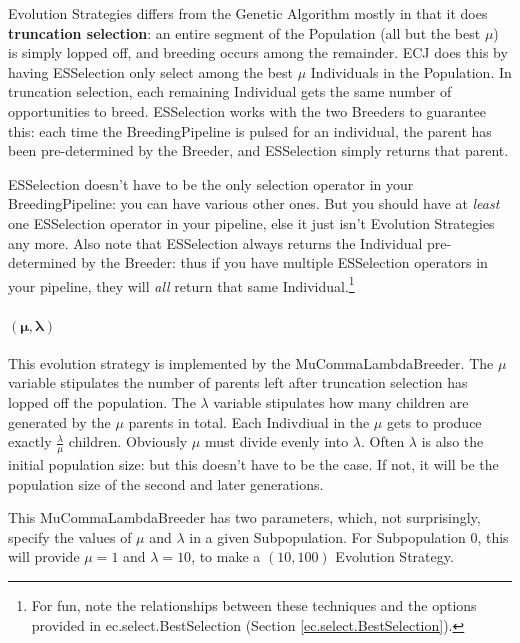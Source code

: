 \documentclass[twoside,10pt]{book}
\newcommand\class[1]{\index{#1}\textsf{#1}}
\begin{document}
Evolution Strategies differs from the Genetic Algorithm mostly in that it does {\bf truncation selection}: an entire segment of the Population (all but the best \(\mu\)) is simply lopped off, and breeding occurs among the remainder.  ECJ does this by having ESSelection only select among the best \(\mu\) Individuals in the Population. In truncation selection, each remaining Individual gets the same number of opportunities to breed.  ESSelection works with the two Breeders to guarantee this: each time the BreedingPipeline is pulsed for an individual, the parent has been pre-determined by the Breeder, and ESSelection simply returns that parent.

ESSelection doesn't have to be the only selection operator in your BreedingPipeline: you can have various other ones.  But you should have at {\it least} one ESSelection operator in your pipeline, else it just isn't Evolution Strategies any more.  Also note that ESSelection always returns the Individual pre-determined by the Breeder: thus if you have multiple ESSelection operators in your pipeline, they will {\it all} return that same Individual.\footnote{For fun, note the relationships between these techniques and the options provided in \class{ec.select.BestSelection} (Section \ref{ec.select.BestSelection}).}

\paragraph{\(\boldsymbol{(\mu, \lambda)}\)}
This evolution strategy is implemented by the MuCommaLambdaBreeder.  The \(\mu\) variable stipulates the number of parents left after truncation selection has lopped off the population.  The \(\lambda\) variable stipulates how many children are generated by the \(\mu\) parents in total.  Each Indivdiual in the \(\mu\) gets to produce exactly \(\frac{\lambda}{\mu}\) children.  Obviously \(\mu\) must divide evenly into \(\lambda\).  Often \(\lambda\) is also the initial population size: but this doesn't have to be the case.  If not, it will be the population size of the second and later generations.

This MuCommaLambdaBreeder  has two parameters, which, not surprisingly, specify the values of \(\mu\) and \(\lambda\) in a given Subpopulation.  For Subpopulation 0, this will provide \(\mu=1\) and \(\lambda=10\), to make a \((10,100)\) Evolution Strategy.
\end{document}
